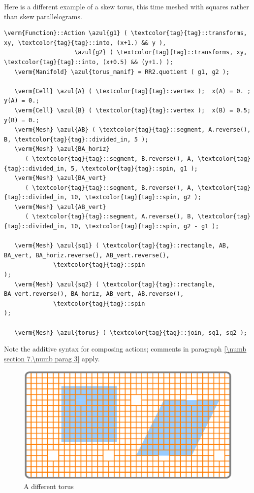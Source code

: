 Here is a different example of a skew torus, this time meshed with squares
rather than skew parallelograms.

\begin{Verbatim}[commandchars=\\\{\},formatcom=\small\tt,frame=single,
   label=parag-\ref{\numb section 7.\numb parag 8}.cpp,rulecolor=\color{coment},
   baselinestretch=0.94,framesep=2mm                                            ]
   \verm{Function}::Action \azul{g1} ( \textcolor{tag}{tag}::transforms, xy, \textcolor{tag}{tag}::into, (x+1.) && y ),
                    \azul{g2} ( \textcolor{tag}{tag}::transforms, xy, \textcolor{tag}{tag}::into, (x+0.5) && (y+1.) );
   \verm{Manifold} \azul{torus_manif} = RR2.quotient ( g1, g2 );

   \verm{Cell} \azul{A} ( \textcolor{tag}{tag}::vertex );  x(A) = 0. ;  y(A) = 0.;
   \verm{Cell} \azul{B} ( \textcolor{tag}{tag}::vertex );  x(B) = 0.5;  y(B) = 0.;
   \verm{Mesh} \azul{AB} ( \textcolor{tag}{tag}::segment, A.reverse(), B, \textcolor{tag}{tag}::divided_in, 5 );
   \verm{Mesh} \azul{BA_horiz}
      ( \textcolor{tag}{tag}::segment, B.reverse(), A, \textcolor{tag}{tag}::divided_in, 5, \textcolor{tag}{tag}::spin, g1 );
   \verm{Mesh} \azul{BA_vert}
      ( \textcolor{tag}{tag}::segment, B.reverse(), A, \textcolor{tag}{tag}::divided_in, 10, \textcolor{tag}{tag}::spin, g2 );
   \verm{Mesh} \azul{AB_vert}
      ( \textcolor{tag}{tag}::segment, A.reverse(), B, \textcolor{tag}{tag}::divided_in, 10, \textcolor{tag}{tag}::spin, g2 - g1 );

   \verm{Mesh} \azul{sq1} ( \textcolor{tag}{tag}::rectangle, AB, BA_vert, BA_horiz.reverse(), AB_vert.reverse(),
              \textcolor{tag}{tag}::spin                                                          );
   \verm{Mesh} \azul{sq2} ( \textcolor{tag}{tag}::rectangle, BA_vert.reverse(), BA_horiz, AB_vert, AB.reverse(),
              \textcolor{tag}{tag}::spin                                                          );

   \verm{Mesh} \azul{torus} ( \textcolor{tag}{tag}::join, sq1, sq2 );
\end{Verbatim}

Note the additive syntax for composing actions; comments in paragraph
\ref{\numb section 7.\numb parag 3} apply.

\begin{figure}[ht] \centering
  \includegraphics[width=120mm]{flat-torus-4.eps}
  \caption{A different torus}
  \label{\numb section 7.\numb fig 4}
\end{figure}

